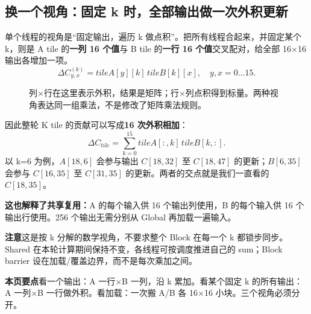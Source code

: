 \documentclass[UTF8,11pt,a4paper,fontset=fandol]{ctexart}
\newcommand{\takeaway}[1]{\par\noindent\colorbox{PaleBlue}{\parbox{\dimexpr\linewidth-2\fboxsep\relax}{\textbf{本页要点}\quad #1}}\par}
\newcommand{\caution}[1]{\par\noindent\colorbox{PaleOrange}{\parbox{\dimexpr\linewidth-2\fboxsep\relax}{\textbf{注意}\quad #1}}\par}
\newcommand{\pagebreakhere}{\clearpage}
\begin{document}
\subsection{换一个视角：固定 k 时，全部输出做一次外积更新}
单个线程的视角是“固定输出，遍历 k 做点积”。把所有线程合起来，并固定某个 k，则是 A tile 的\textbf{一列 16 个值}与 B tile 的\textbf{一行 16 个值}交叉配对，给全部 16×16 输出各增加一项。
\[
\Delta C_{y,x}^{(k)}=tileA[y][k]\,tileB[k][x],\quad y,x=0\ldots15.
\]
\begin{figure}[H]\centering
{}
\caption{列×行在这里表示外积，结果是矩阵；行×列点积得到标量。两种视角表达同一组乘法，不是修改了矩阵乘法规则。}
\end{figure}

因此整轮 K tile 的贡献可以写成\textbf{16 次外积相加}：
\[
\Delta C_{tile}=\sum_{k=0}^{15} tileA[:,k]\,tileB[k,:].
\]
以 k=6 为例，$A[18,6]$ 会参与输出 $C[18,32]$ 至 $C[18,47]$ 的更新；$B[6,35]$ 会参与 $C[16,35]$ 至 $C[31,35]$ 的更新。两者的交点就是我们一直看的 $C[18,35]$。

\textbf{这也解释了共享复用：}A 的每个输入供 16 个输出列使用，B 的每个输入供 16 个输出行使用。256 个输出无需分别从 Global 再加载一遍输入。

\caution{这是按 k 分解的数学视角，不要求整个 Block 在每一个 k 都锁步同步。Shared 在本轮计算期间保持不变，各线程可按调度推进自己的 sum；Block barrier 设在加载/覆盖边界，而不是每次乘加之间。}
\takeaway{看一个输出：A 一行×B 一列，沿 k 累加。看某个固定 k 的所有输出：A 一列×B 一行做外积。看加载：一次搬 A/B 各 16×16 小块。三个视角必须分开。}
\pagebreakhere
\end{document}

